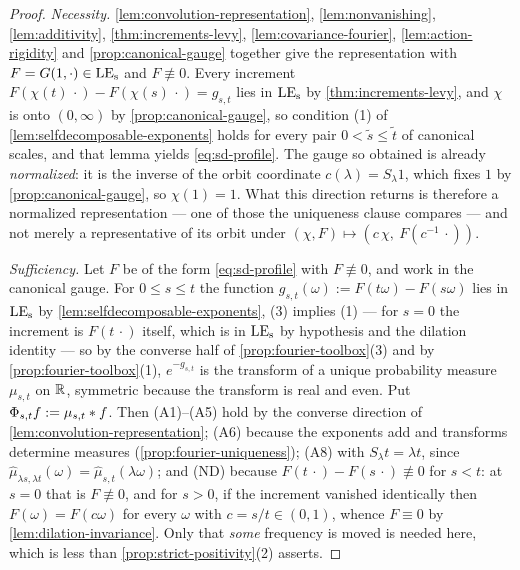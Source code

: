 \begin{proof}
\leanok
\emph{Necessity.} \ref{lem:convolution-representation}, \ref{lem:nonvanishing},
\ref{lem:additivity}, \ref{thm:increments-levy}, \ref{lem:covariance-fourier},
\ref{lem:action-rigidity} and \ref{prop:canonical-gauge} together give the representation with
$F = G(1,\cdot) \in \mathrm{LE}_{\mathrm{s}}$ and $F \not\equiv 0$. Every increment
$F(\chi(t)\,\cdot) - F(\chi(s)\,\cdot) = g_{s,t}$ lies in $\mathrm{LE}_{\mathrm{s}}$ by \ref{thm:increments-levy},
and $\chi$ is onto $(0,\infty)$ by \ref{prop:canonical-gauge}, so condition (1) of
\ref{lem:selfdecomposable-exponents} holds for every pair $0 < \tilde s \le \tilde t$ of
canonical scales, and that lemma yields \ref{eq:sd-profile}. The gauge so obtained is already
\emph{normalized}: it is the inverse of the orbit coordinate $c(\lambda) = S_\lambda 1$, which
fixes $1$ by \ref{prop:canonical-gauge}, so $\chi(1) = 1$. What this direction returns is
therefore a normalized representation --- one of those the uniqueness clause compares --- and
not merely a representative of its orbit under
$(\chi,F) \mapsto (c\,\chi,\ F(c^{-1}\,\cdot))$.

\emph{Sufficiency.} Let $F$ be of the form \ref{eq:sd-profile} with $F \not\equiv 0$, and work
in the canonical gauge. For $0 \le s \le t$ the function
$g_{s,t}(\omega) := F(t\omega) - F(s\omega)$ lies in $\mathrm{LE}_{\mathrm{s}}$ by
\ref{lem:selfdecomposable-exponents}, (3) implies (1) --- for $s = 0$ the increment is
$F(t\,\cdot)$ itself, which is in $\mathrm{LE}_{\mathrm{s}}$ by hypothesis and the dilation identity --- so by the
converse half of \ref{prop:fourier-toolbox}(3) and by \ref{prop:fourier-toolbox}(1),
$e^{-g_{s,t}}$ is the transform of a unique probability measure $\mu_{s,t}$ on $\mathbb{R}$, symmetric
because the transform is real and even. Put $\Phi_{s,t}f := \mu_{s,t} * f$. Then (A1)--(A5)
hold by the converse direction of \ref{lem:convolution-representation}; (A6) because the
exponents add and transforms determine measures (\ref{prop:fourier-uniqueness}); (A8) with
$S_\lambda t = \lambda t$, since $\hat\mu_{\lambda s,\lambda t}(\omega) =
\hat\mu_{s,t}(\lambda\omega)$; and (ND) because $F(t\,\cdot) - F(s\,\cdot) \not\equiv 0$ for
$s < t$: at $s = 0$ that is $F \not\equiv 0$, and for $s > 0$, if the increment vanished
identically then $F(\omega) = F(c\omega)$ for every $\omega$ with $c = s/t \in (0,1)$, whence
$F \equiv 0$ by \ref{lem:dilation-invariance}. Only that \emph{some} frequency is moved is
needed here, which is less than \ref{prop:strict-positivity}(2) asserts.


\end{proof}
